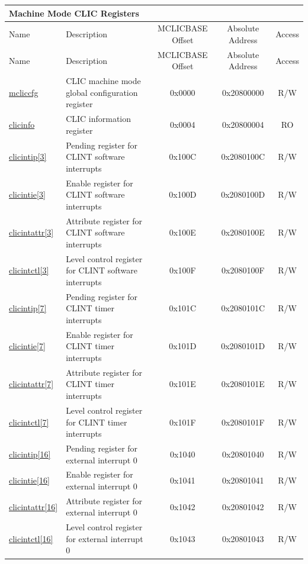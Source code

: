 \begin{longtable}{ | p{1.8cm} | p{7.5cm} | c | c | c | }
\hline
\multicolumn{5}{|l|}{\textbf{Machine Mode CLIC Registers}} \\\hline
\hline\rowcolor{lightgray}
Name & Description & MCLICBASE Offset & Absolute Address & Access \\ \hline
\endfirsthead
\hline
\rowcolor{lightgray}
Name & Description & MCLICBASE Offset & Absolute Address & Access \\
\hline
\endhead
\endfoot
\hyperref[regdesc:MCLICCFG_REG]{mcliccfg} & CLIC machine mode global configuration register & 0x0000 & 0x20800000 & R/W \\\hline
\hyperref[regdesc:CLICINFO_REG]{clicinfo} & CLIC information register & 0x0004 & 0x20800004 & RO \\\hline

\hyperref[regdesc:MCLICINTIP_REG_i]{clicintip[3]} & Pending register for CLINT software interrupts & 0x100C & 0x2080100C & R/W \\\hline
\hyperref[regdesc:MCLICINTIE_REG_i]{clicintie[3]} & Enable register for CLINT software interrupts & 0x100D & 0x2080100D & R/W \\\hline
\hyperref[regdesc:MCLICINTATTR_REG_i]{clicintattr[3]} & Attribute register for CLINT software interrupts & 0x100E & 0x2080100E & R/W \\\hline
\hyperref[regdesc:MCLICINTCTL_REG_i]{clicintctl[3]} & Level control register for CLINT software interrupts & 0x100F & 0x2080100F & R/W \\\hline

\hyperref[regdesc:MCLICINTIP_REG_i]{clicintip[7]} & Pending register for CLINT timer interrupts & 0x101C & 0x2080101C & R/W \\\hline
\hyperref[regdesc:MCLICINTIE_REG_i]{clicintie[7]} & Enable register for CLINT timer interrupts & 0x101D & 0x2080101D & R/W \\\hline
\hyperref[regdesc:MCLICINTATTR_REG_i]{clicintattr[7]} & Attribute register for CLINT timer interrupts & 0x101E & 0x2080101E & R/W \\\hline
\hyperref[regdesc:MCLICINTCTL_REG_i]{clicintctl[7]} & Level control register for CLINT timer interrupts & 0x101F & 0x2080101F & R/W \\\hline

\hyperref[regdesc:MCLICINTIP_REG_i]{clicintip[16]} & Pending register for external interrupt 0 & 0x1040 & 0x20801040 & R/W \\\hline
\hyperref[regdesc:MCLICINTIE_REG_i]{clicintie[16]} & Enable register for external interrupt 0 & 0x1041 & 0x20801041 & R/W \\\hline
\hyperref[regdesc:MCLICINTATTR_REG_i]{clicintattr[16]} & Attribute register for external interrupt 0 & 0x1042 & 0x20801042 & R/W \\\hline
\hyperref[regdesc:MCLICINTCTL_REG_i]{clicintctl[16]} & Level control register for  external interrupt 0 & 0x1043 & 0x20801043 & R/W \\\hline


\end{longtable}
